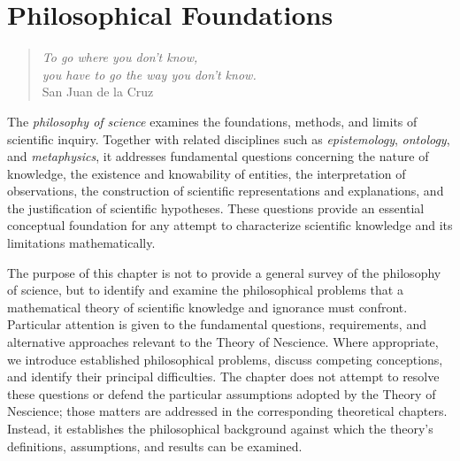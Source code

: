%
%


\chapter{Philosophical Foundations}
\label{chap:Philosophy}

\begin{quote}
\begin{flushright}
\emph{To go where you don't know, \\
you have to go the way you don't know.} \\
San Juan de la Cruz 
\end{flushright}
\end{quote}
\bigskip

The \emph{philosophy of science} examines the foundations, methods, and limits of scientific inquiry. Together with related disciplines such as \emph{epistemology}, \emph{ontology}, and \emph{metaphysics}, it addresses fundamental questions concerning the nature of knowledge, the existence and knowability of entities, the interpretation of observations, the construction of scientific representations and explanations, and the justification of scientific hypotheses. These questions provide an essential conceptual foundation for any attempt to characterize scientific knowledge and its limitations mathematically.

The purpose of this chapter is not to provide a general survey of the philosophy of science, but to identify and examine the philosophical problems that a mathematical theory of scientific knowledge and ignorance must confront. Particular attention is given to the fundamental questions, requirements, and alternative approaches relevant to the Theory of Nescience. Where appropriate, we introduce established philosophical problems, discuss competing conceptions, and identify their principal difficulties. The chapter does not attempt to resolve these questions or defend the particular assumptions adopted by the Theory of Nescience; those matters are addressed in the corresponding theoretical chapters. Instead, it establishes the philosophical background against which the theory's definitions, assumptions, and results can be examined.

